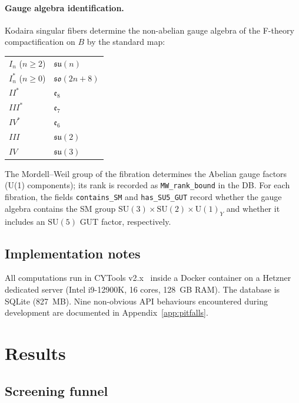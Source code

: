 \documentclass[11pt,a4paper]{article}
\begin{document}
\paragraph{Gauge algebra identification.}
Kodaira singular fibers determine the non-abelian gauge algebra of the
F-theory compactification on $B$ by the standard map:
\begin{center}\small
\begin{tabular}{ll}
$I_n$ ($n \geq 2$) & $\mathfrak{su}(n)$ \\
$I_n^*$ ($n \geq 0$) & $\mathfrak{so}(2n+8)$ \\
$II^*$ & $\mathfrak{e}_8$ \\
$III^*$ & $\mathfrak{e}_7$ \\
$IV^*$ & $\mathfrak{e}_6$ \\
$III$ & $\mathfrak{su}(2)$ \\
$IV$ & $\mathfrak{su}(3)$ \\
\end{tabular}\end{center}
The Mordell--Weil group of the fibration determines the
Abelian gauge factors (U(1) components);
its rank is recorded as \texttt{MW\_rank\_bound} in the DB.
For each fibration, the fields \texttt{contains\_SM} and
\texttt{has\_SU5\_GUT} record whether the gauge algebra
contains the SM group $\mathrm{SU}(3)\times\mathrm{SU}(2)\times\mathrm{U}(1)_Y$
and whether it includes an $\mathrm{SU}(5)$ GUT factor, respectively.

\subsection{Implementation notes}

All computations run in CYTools v2.x~\cite{CYTools2022}
inside a Docker container on a Hetzner dedicated server
(Intel i9-12900K, 16 cores, 128~GB RAM).
The database is SQLite (827~MB).
Nine non-obvious API behaviours encountered during development
are documented in Appendix~\ref{app:pitfalls}.

\section{Results}
\label{sec:results}

\subsection{Screening funnel}
\label{sec:funnel}
\end{document}
